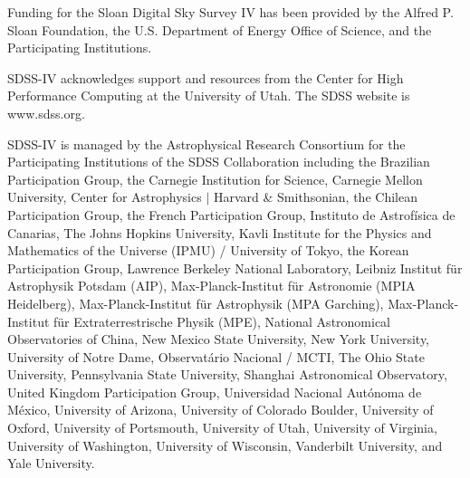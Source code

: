 \documentclass[twocolumn, tighten, astrosymb]{aastex631}
\begin{document}
\begin{acknowledgments}
Funding for the Sloan Digital Sky Survey IV has been provided by the Alfred P. Sloan Foundation, the U.S. Department of Energy Office of Science, and the Participating Institutions. 

SDSS-IV acknowledges support and resources from the Center for High Performance Computing  at the University of Utah. The SDSS website is www.sdss.org.

SDSS-IV is managed by the Astrophysical Research Consortium for the Participating Institutions of the SDSS Collaboration including the Brazilian Participation Group, the Carnegie Institution for Science, Carnegie Mellon University, Center for Astrophysics $|$ Harvard \& Smithsonian, the Chilean Participation Group, the French Participation Group, Instituto de Astrof\'isica de Canarias, The Johns Hopkins University, Kavli Institute for the Physics and Mathematics of the Universe (IPMU) / University of Tokyo, the Korean Participation Group, Lawrence Berkeley National Laboratory, Leibniz Institut f\"ur Astrophysik Potsdam (AIP),  Max-Planck-Institut f\"ur Astronomie (MPIA Heidelberg), Max-Planck-Institut f\"ur Astrophysik (MPA Garching), Max-Planck-Institut f\"ur Extraterrestrische Physik (MPE), National Astronomical Observatories of China, New Mexico State University, New York University, University of Notre Dame, Observat\'ario Nacional / MCTI, The Ohio State University, Pennsylvania State University, Shanghai Astronomical Observatory, United Kingdom Participation Group, Universidad Nacional Aut\'onoma de M\'exico, University of Arizona, University of Colorado Boulder, University of Oxford, University of Portsmouth, University of Utah, University of Virginia, University of Washington, University of Wisconsin, Vanderbilt University, and Yale University.
\end{acknowledgments}


{}

\end{document}
